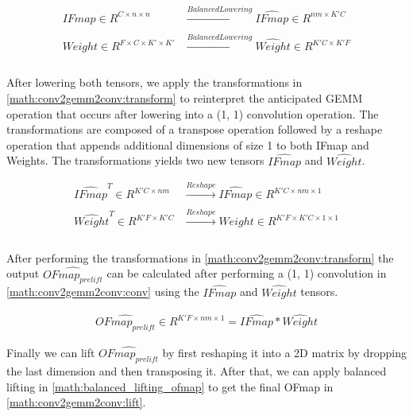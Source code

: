 \begin{equation}
    \begin{aligned}
        IFmap \in R^{C\times n\times n} & \xrightarrow[]{Balanced Lowering} \hat{IFmap} \in R^{nm\times K'C} \\
        Weight \in R^{F\times C\times K' \times K'} & \xrightarrow[]{Balanced Lowering} \hat{Weight} \in R^{K'C\times K'F} \\
    \end{aligned}
    \label{math:conv2gemm2conv:lowering}
\end{equation}

After lowering both tensors, we apply the transformations in
\autoref{math:conv2gemm2conv:transform} to reinterpret the anticipated GEMM
operation that occurs after lowering into a (1, 1) convolution operation. The
transformations are composed of a transpose operation followed by a reshape
operation that appends additional dimensions of size 1 to both IFmap and
Weights. The transformations yields two new tensors $\hat{IFmap}$ and
$\hat{Weight}$.

\begin{equation}
    \begin{aligned}
        \hat{IFmap}^T \in R^{K'C \times nm} & \xrightarrow[]{Reshape} \hat{IFmap} \in R^{K'C \times nm \times 1} \\
        \hat{Weight}^T \in R^{K'F\times K'C} & \xrightarrow[]{Reshape} Weight \in R^{K'F\times K'C \times 1 \times 1} \\
        \end{aligned}
    \label{math:conv2gemm2conv:transform}
\end{equation}

After performing the transformations in \autoref{math:conv2gemm2conv:transform}
the output $\hat{OFmap_{prelift}}$ can be calculated after performing a (1, 1)
convolution in \autoref{math:conv2gemm2conv:conv} using the $\hat{IFmap}$ and
$\hat{Weight}$ tensors. 

\begin{equation}
    \begin{aligned}
        \hat{OFmap_{prelift}} \in R^{K'F\times nm \times 1} = \hat{IFmap}*\hat{Weight}
        \end{aligned}
    \label{math:conv2gemm2conv:conv}
\end{equation}

Finally we can lift $\hat{OFmap_{prelift}}$ by first reshaping it into a 2D
matrix by dropping the last dimension and then transposing it. After that, we
can apply balanced lifting in \autoref{math:balanced_lifting_ofmap} to get the
final OFmap in \autoref{math:conv2gemm2conv:lift}.

